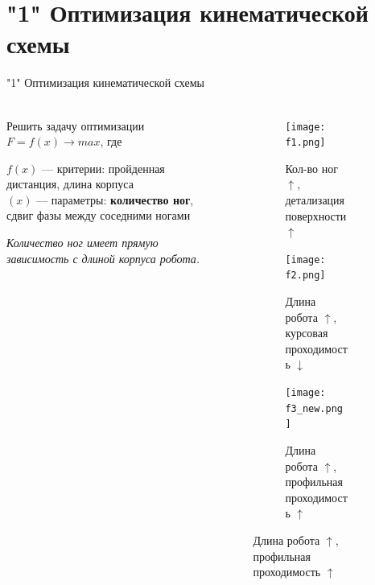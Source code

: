 \section{"1" Оптимизация кинематической схемы}

\begin{frame}[t]{"1" Оптимизация кинематической схемы}
    \framesubtitle{}
    \begin{columns}[T,onlytextwidth]
        \begin{column}{0.45\textwidth}
            Решить задачу оптимизации $F=f(x) \rightarrow max$, где

            $f(x)$ --- критерии: пройденная дистанция, длина корпуса\\
            $(x)$ --- параметры: \textbf{количество ног}, сдвиг фазы между соседними ногами
            \medskip

            \textit{Количество ног имеет прямую зависимость с длиной корпуса робота.}
        \end{column}
        \begin{column}{0.54\textwidth}
            \vspace{-0.5cm}
            \begin{figure}[H]
                \begin{subfigure}{0.99\textwidth}
                    \centering\texttt{[image: f1.png]}
                    \caption*{Кол-во ног $\uparrow$, детализация поверхности $\uparrow$}
                \end{subfigure}

                \begin{subfigure}{0.99\textwidth}
                    \centering\texttt{[image: f2.png]}
                    \caption*{Длина робота $\uparrow$, курсовая проходимость $\downarrow$}
                \end{subfigure}

                \begin{subfigure}{0.99\textwidth}
                    \centering\texttt{[image: f3\_new.png]}
                    \caption*{Длина робота $\uparrow$, профильная проходимость $\uparrow$}
                \end{subfigure}
            \end{figure}
        \end{column}
    \end{columns}
\end{frame}


